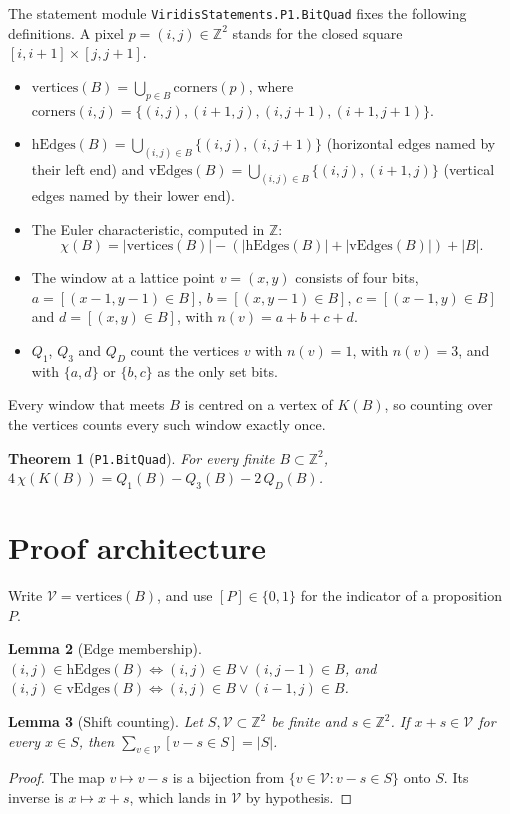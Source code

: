 \documentclass[11pt]{article}
\newtheorem{theorem}{Theorem}
\newtheorem{lemma}[theorem]{Lemma}
\theoremstyle{definition}
\theoremstyle{remark}
\begin{document}
The statement module \texttt{ViridisStatements.P1.BitQuad} fixes the following
definitions. A pixel $p=(i,j)\in\mathbb{Z}^2$ stands for the closed square
$[i,i+1]\times[j,j+1]$.
\begin{itemize}
\item $\mathrm{vertices}(B)=\bigcup_{p\in B}\mathrm{corners}(p)$, where
  $\mathrm{corners}(i,j)=\{(i,j),(i+1,j),(i,j+1),(i+1,j+1)\}$.
\item $\mathrm{hEdges}(B)=\bigcup_{(i,j)\in B}\{(i,j),(i,j+1)\}$ (horizontal
  edges named by their left end) and
  $\mathrm{vEdges}(B)=\bigcup_{(i,j)\in B}\{(i,j),(i+1,j)\}$ (vertical edges named
  by their lower end).
\item The Euler characteristic, computed in $\mathbb{Z}$:
  \[\chi(B) = |\mathrm{vertices}(B)| - (|\mathrm{hEdges}(B)|+|\mathrm{vEdges}(B)|) + |B|.\]
\item The window at a lattice point $v=(x,y)$ consists of four bits,
  $a=[(x-1,y-1)\in B]$, $b=[(x,y-1)\in B]$, $c=[(x-1,y)\in B]$ and
  $d=[(x,y)\in B]$, with $n(v)=a+b+c+d$.
\item $Q_1$, $Q_3$ and $Q_D$ count the vertices $v$ with $n(v)=1$, with
  $n(v)=3$, and with $\{a,d\}$ or $\{b,c\}$ as the only set bits.
\end{itemize}
Every window that meets $B$ is centred on a vertex of $K(B)$, so counting over
the vertices counts every such window exactly once.

\begin{theorem}[\texttt{P1.BitQuad}]\label{thm:main}
For every finite $B\subset\mathbb{Z}^2$,
$4\,\chi(K(B)) = Q_1(B) - Q_3(B) - 2\,Q_D(B)$.
\end{theorem}

\section{Proof architecture}

Write $\mathcal V=\mathrm{vertices}(B)$, and use $[P]\in\{0,1\}$ for the indicator
of a proposition $P$.

\begin{lemma}[Edge membership]\label{lem:edges}
$(i,j)\in\mathrm{hEdges}(B) \iff (i,j)\in B \lor (i,j-1)\in B$, and
$(i,j)\in\mathrm{vEdges}(B) \iff (i,j)\in B \lor (i-1,j)\in B$.
\end{lemma}

\begin{lemma}[Shift counting]\label{lem:shift}
Let $S,\mathcal V\subset\mathbb{Z}^2$ be finite and $s\in\mathbb{Z}^2$. If $x+s\in\mathcal V$
for every $x\in S$, then $\sum_{v\in\mathcal V}[v-s\in S]=|S|$.
\end{lemma}
\begin{proof}
The map $v\mapsto v-s$ is a bijection from $\{v\in\mathcal V: v-s\in S\}$ onto
$S$. Its inverse is $x\mapsto x+s$, which lands in $\mathcal V$ by hypothesis.
\end{proof}
\end{document}
